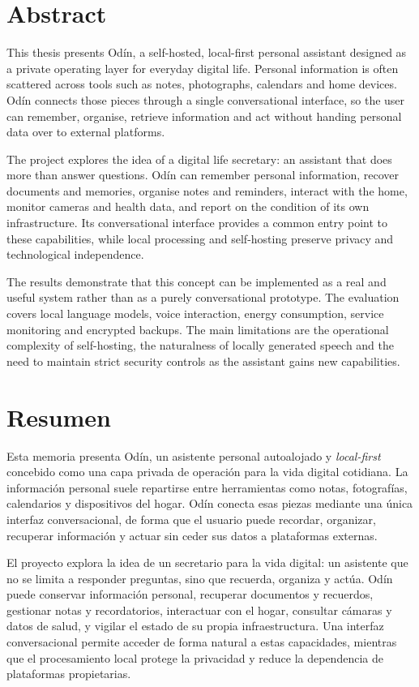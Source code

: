 \chapter*{Abstract}

This thesis presents Odín, a self-hosted, local-first personal assistant designed as a private operating layer for everyday digital life. Personal information is often scattered across tools such as notes, photographs, calendars and home devices. Odín connects those pieces through a single conversational interface, so the user can remember, organise, retrieve information and act without handing personal data over to external platforms.

The project explores the idea of a digital life secretary: an assistant that does more than answer questions. Odín can remember personal information, recover documents and memories, organise notes and reminders, interact with the home, monitor cameras and health data, and report on the condition of its own infrastructure. Its conversational interface provides a common entry point to these capabilities, while local processing and self-hosting preserve privacy and technological independence.

The results demonstrate that this concept can be implemented as a real and useful system rather than as a purely conversational prototype. The evaluation covers local language models, voice interaction, energy consumption, service monitoring and encrypted backups. The main limitations are the operational complexity of self-hosting, the naturalness of locally generated speech and the need to maintain strict security controls as the assistant gains new capabilities.

\chapter*{Resumen}

Esta memoria presenta Odín, un asistente personal autoalojado y \textit{local-first} concebido como una capa privada de operación para la vida digital cotidiana. La información personal suele repartirse entre herramientas como notas, fotografías, calendarios y dispositivos del hogar. Odín conecta esas piezas mediante una única interfaz conversacional, de forma que el usuario puede recordar, organizar, recuperar información y actuar sin ceder sus datos a plataformas externas.

El proyecto explora la idea de un secretario para la vida digital: un asistente que no se limita a responder preguntas, sino que recuerda, organiza y actúa. Odín puede conservar información personal, recuperar documentos y recuerdos, gestionar notas y recordatorios, interactuar con el hogar, consultar cámaras y datos de salud, y vigilar el estado de su propia infraestructura. Una interfaz conversacional permite acceder de forma natural a estas capacidades, mientras que el procesamiento local protege la privacidad y reduce la dependencia de plataformas propietarias.

